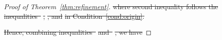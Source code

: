 \documentclass[lettersize,onecolumn,journal]{IEEEtran}
\theoremstyle{definition}
\theoremstyle{definition}
\newcommand{\of}[1]{\left(#1\right)}
\newcommand{\aabs}[1]{\left|#1\right|}
\providecommand{\DIFdeltex}[1]{{\protect\color{red}\sout{#1}}}                      %
\providecommand{\DIFdel}[1]{\texorpdfstring{\DIFdeltex{#1}}{}} %
\begin{document}
\begin{proof}[Proof of Theorem~\ref{thm:refinement}]
\DIFdel{where second inequality follows the inequalities~}%
\DIFdel{, }%
\DIFdel{, and }%
\DIFdel{in Condition~\ref{cond:origin}.
     }%

\DIFdel{Hence, combining inequalities~}%
\DIFdel{and~}%
\DIFdel{,  we have 
    }%




\end{proof}
\end{document}
